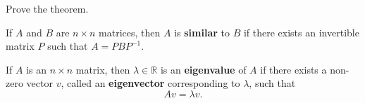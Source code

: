 \documentclass[12pt,letterpaper]{article}
\begin{document}
\begin{enumerate}
\Problem Prove the theorem.

\vfill

\begin{defn}
If $A$ and $B$ are $n\times n$ matrices, then $A$ is {\bf similar} to $B$ if there exists an invertible matrix $P$ such that $A=PB P^{-1}$.
\end{defn}

\begin{defn}
If $A$ is an $n \times n$ matrix, then $\lambda \in \mathbb{R}$ is an {\bf eigenvalue} of $A$ if there exists a non-zero vector $v$, called an {\bf eigenvector} corresponding to $\lambda$, such that $$Av=\lambda v.$$
\end{defn}

\newpage

%
%
%

\end{enumerate}
\end{document}
